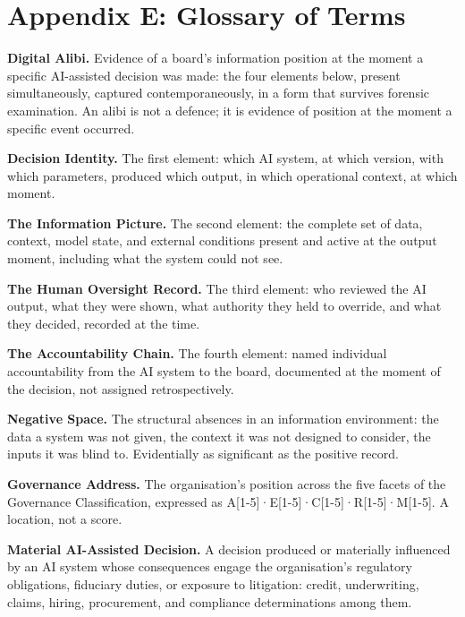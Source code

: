 
\chapter*{Appendix E: Glossary of Terms}

\textbf{Digital Alibi.} Evidence of a board's information position at the moment a specific AI-assisted decision was made: the four elements below, present simultaneously, captured contemporaneously, in a form that survives forensic examination. An alibi is not a defence; it is evidence of position at the moment a specific event occurred.

\textbf{Decision Identity.} The first element: which AI system, at which version, with which parameters, produced which output, in which operational context, at which moment.

\textbf{The Information Picture.} The second element: the complete set of data, context, model state, and external conditions present and active at the output moment, including what the system could not see.

\textbf{The Human Oversight Record.} The third element: who reviewed the AI output, what they were shown, what authority they held to override, and what they decided, recorded at the time.

\textbf{The Accountability Chain.} The fourth element: named individual accountability from the AI system to the board, documented at the moment of the decision, not assigned retrospectively.

\textbf{Negative Space.} The structural absences in an information environment: the data a system was not given, the context it was not designed to consider, the inputs it was blind to. Evidentially as significant as the positive record.

\textbf{Governance Address.} The organisation's position across the five facets of the Governance Classification, expressed as A{[}1-5{]}·E{[}1-5{]}·C{[}1-5{]}·R{[}1-5{]}·M{[}1-5{]}. A location, not a score.

\textbf{Material AI-Assisted Decision.} A decision produced or materially influenced by an AI system whose consequences engage the organisation's regulatory obligations, fiduciary duties, or exposure to litigation: credit, underwriting, claims, hiring, procurement, and compliance determinations among them.

